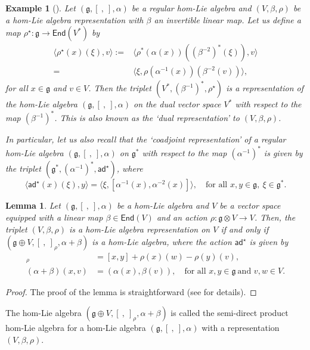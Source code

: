 \documentclass[a4paper,11pt]{amsart}
\theoremstyle{plain}
\newtheorem{lemma}[theorem]{Lemma}
\newtheorem{example}[theorem]{Example}
\theoremstyle{definition}
\theoremstyle{remark}
\numberwithin{equation}{section}
\begin{document}
\begin{example}[\cite{hom-Liebi}]\label{coadjoint rep}
Let $(\mathfrak{g},[~,~],\alpha)$ be a regular hom-Lie algebra and $(V,\beta,\rho)$ be a hom-Lie algebra representation with $\beta$ an invertible linear map. Let us define a map $\rho^\star:\mathfrak{g}\rightarrow\mathsf{End}(V^*)$ by
\begin{align*}
\langle\rho^{\star}(x)(\xi),v\rangle :=&\langle\rho^*(\alpha(x))((\beta^{-2})^*(\xi)),v\rangle \\
=&\langle\xi,\rho(\alpha^{-1}(x))(\beta^{-2}(v))\rangle,
\end{align*}
for all $x\in\mathfrak{g}$ and $v\in V$. Then the triplet $(V^*,(\beta^{-1})^*,\rho^\star)$ is a representation of the hom-Lie algebra $(\mathfrak{g},[~,~],\alpha)$ on the dual vector space $V^*$ with respect to the map $(\beta^{-1})^*$. This is also known as the `dual representation' to $(V,\beta,\rho)$. 

In particular, let us also recall that the `coadjoint representation' of a regular hom-Lie algebra $(\mathfrak{g},[~,~],\alpha)$ on $\mathfrak{g}^*$ with respect to the map $(\alpha^{-1})^*$ is given by the triplet $(\mathfrak{g}^*,(\alpha^{-1})^*,\mathsf{ad}^\star)$, where
$$\langle \mathsf{ad}^\star(x)(\xi),y\rangle=\langle\xi, [\alpha^{-1}(x),\alpha^{-2}(x)]\rangle, \quad\mbox{for all }x,y\in\mathfrak{g},~\xi\in \mathfrak{g}^*.$$
\end{example}




\begin{lemma}\label{direct sum}
Let $(\mathfrak{g},[~,~],\alpha)$ be a hom-Lie algebra and $V$ be a vector space equipped with a linear map $\beta\in \mathsf{End}(V)$ and an action $\rho:\mathfrak{g}\otimes V\rightarrow V$. Then, the triplet $(V,\beta,\rho)$ is a hom-Lie algebra representation on $V$ if and only if $(\mathfrak{g}\oplus V,[~,~]_{\rho},\alpha+\beta)$ is a hom-Lie algebra, where the action $\mathsf{ad}^\star$ is given by 
\begin{align*}
[x+v,y+w]_{\rho}&=[x,y]+\rho(x)(w)-\rho(y)(v),\\
(\alpha+\beta)(x,v)&=(\alpha(x),\beta(v)),\quad\mbox{for all }x,y\in \mathfrak{g}~\mbox{and } v,w\in V.
\end{align*}
\end{lemma}
\begin{proof}
The proof of the lemma is straightforward (see \cite{Sheng} for details).
\end{proof}
The hom-Lie algebra $(\mathfrak{g}\oplus V,[~,~]_{\rho},\alpha+\beta)$ is called the semi-direct product hom-Lie algebra for a hom-Lie algebra $(\mathfrak{g},[~,~],\alpha)$ with a representation $(V,\beta,\rho)$.
\end{document}

